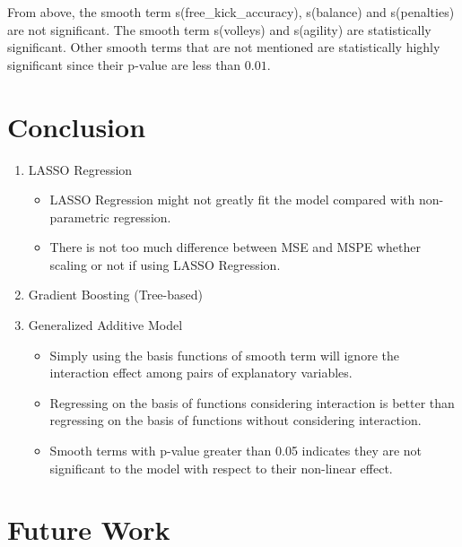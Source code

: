 \documentclass[11pt]{article}
\begin{document}
\noindent From above, the smooth term s(free\_kick\_accuracy), s(balance) and s(penalties) are not significant. The smooth term s(volleys) and s(agility) are statistically significant. Other smooth terms that are not mentioned are statistically highly significant since their p-value are less than $0.01$.

\section{Conclusion}

\begin{enumerate}
\item LASSO Regression
\begin{itemize}
\item LASSO Regression might not greatly fit the model compared with non-parametric regression.
\item There is not too much difference  between MSE and MSPE whether scaling or not if using LASSO Regression.
\end{itemize}
\item Gradient Boosting (Tree-based)
\item Generalized Additive Model
\begin{itemize}
\item Simply using the basis functions of smooth term will ignore the interaction effect among pairs of explanatory variables.
\item Regressing on the basis of functions considering interaction is better than regressing on the basis of functions without considering interaction.
\item Smooth terms with p-value greater than 0.05 indicates they are not significant to the model with respect to their non-linear effect.
\end{itemize}
\end{enumerate}

\section{Future Work}
\end{document}
